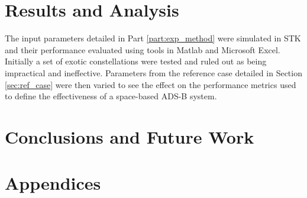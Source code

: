 \documentclass[12pt, a4paper, subeqn]{article}
\numberwithin{figure}{section}
\numberwithin{table}{section}
\numberwithin{equation}{section}
\begin{document}
\part{Results and Analysis}\label{part:results}
The input parameters detailed in Part \ref{part:exp_method} were simulated in STK and their performance evaluated using tools in Matlab and Microsoft Excel. Initially a set of exotic constellations were tested and ruled out as being impractical and ineffective. Parameters from the reference case detailed in Section \ref{sec:ref_case} were then varied to see the effect on the performance metrics used to define the effectiveness of a space-based ADS-B system. 







\part{Conclusions and Future Work}\label{part:concl}



%
\newpage



\newpage
{}
\part*{Appendices}
\appendix


\end{document}
